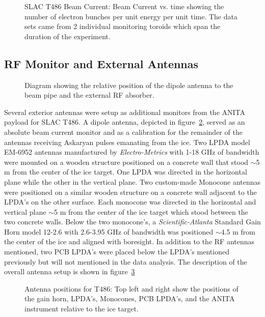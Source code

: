 \begin{figure}[htbp]
\centering
\epsfxsize=4.0in
\caption{SLAC T486 Beam Current:  Beam Current vs. time showing the number of electron bunches per unit energy per unit time.  The data sets came from 2 individual monitoring toroids which span the duration of the experiment.}
\label{fig:beamCurrent}
\end{figure}
%
\subsection{RF Monitor and External Antennas}
\label{ss:extAnt}

\begin{figure}[htbp]
\centering
\epsfxsize=4.0in
\caption{Diagram showing the relative position of the dipole antenna to the beam pipe and the external RF absorber.}
\label{fig:dipole}
\end{figure}

Several exterior antennas were setup as additional monitors from the ANITA payload for SLAC T486.  A dipole antenna, depicted in figure~\ref{fig:dipole}, served as an absolute beam current monitor and as a calibration for the remainder of the antennas receiving Askaryan pulses emanating from the ice.  Two LPDA model EM-6952 antennas manufactured by \textit{Electro-Metrics} with 1-18 GHz of bandwidth were mounted on a wooden structure positioned on a concrete wall that stood $\sim$5 m from the center of the ice target.  One LPDA was directed in the horizontal plane while the other in the vertical plane.  Two custom-made Monocone antennas were positioned on a similar wooden structure on a concrete wall adjacent to the LPDA's on the other surface.  Each monocone was directed in the horizontal and vertical plane $\sim$5 m from the center of the ice target which stood between the two concrete walls.  Below the two monocone's, a \textit{Scientific-Atlanta} Standard Gain Horn model 12-2.6 with 2.6-3.95 GHz of bandwidth was positioned $\sim$4.5 m from the center of the ice and aligned with boresight.  In addition to the RF antennas mentioned, two PCB LPDA's were placed below the LPDA's mentioned previously but will not mentioned in the data analysis.  The description of the overall antenna setup is shown in figure~\ref{fig:externalAnts}

\begin{figure}[htbp]
\centering
\epsfxsize=5.0in
\caption{Antenna positions for T486:  Top left and right show the positions of the gain horn, LPDA's, Monocones, PCB LPDA's, and the ANITA instrument relative to the ice target.}
\label{fig:externalAnts}
\end{figure}

